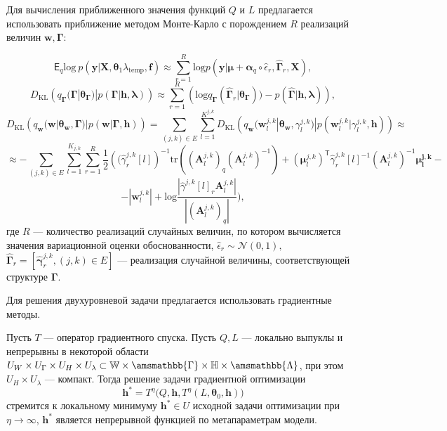 Для вычисления приближенного значения функций $Q$ и $L$ предлагается использовать приближение методом Монте-Карло с порождением $R$ реализаций величин $\mathbf{w}, \boldsymbol{\Gamma}$:

\[
   \mathsf{E}_q \text{log}~p(\mathbf{y}|\mathbf{X}, \boldsymbol{\theta}_1 \lambda_{\text{temp}}, \mathbf{f}) \approx   \sum_{r=1}^R \text{log}p(\mathbf{y}|\boldsymbol{\mu}+\boldsymbol{\alpha}_q \circ \hat{\epsilon}_r, \hat{\boldsymbol{\Gamma}}_r, \mathbf{X}),
\]
\[
D_\text{KL}\left(q_{\boldsymbol{\Gamma}}(\boldsymbol{\Gamma}|\boldsymbol{\theta}_{\boldsymbol{\Gamma}})|p(\boldsymbol{\Gamma}|\mathbf{h}, \boldsymbol{\lambda})\right)   \approx  \sum_{r=1}^R \left(\text{log}q_{\boldsymbol{\Gamma}}(\hat{\boldsymbol{\Gamma}}_r|\boldsymbol{\theta}_{\boldsymbol{\Gamma}}))-p(\hat{\boldsymbol{\Gamma}}|\mathbf{h},\boldsymbol{\lambda})\right),
\]
\[
D_\text{KL}\left(q_{\mathbf{w}}(\mathbf{w}|\boldsymbol{\theta}_\mathbf{w},\boldsymbol{\Gamma})|p(\mathbf{w}|\boldsymbol{\Gamma}, \mathbf{h})\right)  =  \sum_{(j,k) \in E}\sum_{l=1}^{K^{j,k}} D_\text{KL}\left(q_{\mathbf{w}}(\mathbf{w}^{j,k}_l|\boldsymbol{\theta}_\mathbf{w},\gamma^{j,k}_l)|p(\mathbf{w}^{j,k}_l|\gamma^{j,k}_l, \mathbf{h})\right)\approx
\]
\[ 
\approx-\sum_{(j,k) \in E}\sum_{l=1}^{K_{j,k}}\sum_{r=1}^R\frac{1}{2}\left( (\hat{\gamma}^{j,k}_r[l]\right)^{-1}\text{tr}((\mathbf{A}^{j,k}_l)_q(\mathbf{A}^{j,k}_l)^{-1})+(\boldsymbol{\mu}^{j,k}_l)^{\mathsf{T}}\hat{\gamma}^{j,k}_r[l]^{-1}(\mathbf{A}^{j,k}_l)^{-1}\boldsymbol{\mu^{j,k}_l} -
\]
\[
- |\mathbf{w}^{j,k}_l|+\text{log}\frac{|\hat{\gamma}^{j,k}[l]_r\mathbf{A}^{j,k}_l|}{|(\mathbf{A}^{j,k}_l)_q|}),
\]
где $R$ --- количество реализаций случайных величин, по котором вычисляется значения вариационной оценки обоснованности, $\hat{\epsilon}_r \sim \mathcal{N}(0,1),$
 $\hat{\boldsymbol{\Gamma}}_r = [\hat{\boldsymbol{\gamma}}^{j,k}_r, (j,k) \in E]$ --- реализация случайной величины, соответствующей структуре $\boldsymbol{\Gamma}$.

Для решения двухуровневой задачи предлагается использовать градиентные методы. 
\begin{theorem}
Пусть $T$ --- оператор градиентного спуска.
Пусть $Q,L$ --- локально выпуклы и непрерывны в некоторой области $U_{W} \times U_{\Gamma} \times U_H \times U_\lambda \subset \mathbb{W}\times\amsmathbb{\Gamma}\times\mathbb{H}\times\amsmathbb{\Lambda}$, при  этом $U_H \times U_\lambda$ --- компакт. 
Тогда решение задачи градиентной оптимизации 
\[
     \mathbf{h}^{*} = T^\eta\bigl(Q, \mathbf{h}, T^\eta(L, \boldsymbol{\theta}_0, \mathbf{h})\bigr)
\] 
стремится к локальному минимуму  $\mathbf{h}^{*} \in U$ исходной задачи оптимизации при $\eta \to \infty$,
$\mathbf{h}^{*}$ является непрерывной функцией по метапараметрам модели.
\end{theorem}

